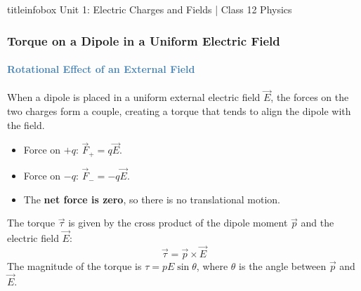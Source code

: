 \begin{frame}
\begin{frame}
\vfill

\begin{beamercolorbox}[wd=\textwidth,ht=0.5cm,dp=0.1cm,center]{titleinfobox}
    \small\color{coolgray} Unit 1: Electric Charges and Fields | Class 12 Physics
\end{beamercolorbox}
\end{frame}

\begin{frame}
\frametitle{\textsf{\textbf{Torque on a Dipole in a Uniform Electric Field}}}
\framesubtitle{\textcolor{steelblue}{Rotational Effect of an External Field}}

\begin{keybox}
\vspace{0.1cm}
When a dipole is placed in a uniform external electric field $\vec{E}$, the forces on the two charges form a couple, creating a torque that tends to align the dipole with the field.
\begin{itemize}
    \item Force on $+q$: $\vec{F}_{+} = q\vec{E}$.
    \item Force on $-q$: $\vec{F}_{-} = -q\vec{E}$.
    \item The \textbf{net force is zero}, so there is no translational motion.
\end{itemize}
\vspace{0.1cm}
\end{keybox}

\vspace{0.3cm}

\begin{formulabox}
\vspace{0.1cm}
The torque $\vec{\tau}$ is given by the cross product of the dipole moment $\vec{p}$ and the electric field $\vec{E}$:
\begin{equation*}
\boxed{\vec{\tau} = \vec{p} \times \vec{E}}
\end{equation*}
The magnitude of the torque is $\tau = pE\sin\theta$, where $\theta$ is the angle between $\vec{p}$ and $\vec{E}$.
\vspace{0.1cm}
\end{formulabox}

\vspace{0.3cm}


\end{frame}
\end{frame}
